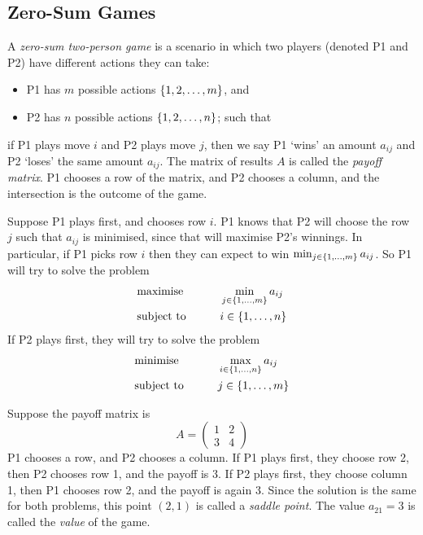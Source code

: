 \subsection{Zero-Sum Games}
\begin{definition}
	A \textit{zero-sum two-person game} is a scenario in which two players (denoted P1 and P2) have different actions they can take:
	\begin{itemize}
		\item P1 has \( m \) possible actions \( \qty{1, 2, \dots, m } \), and
		\item P2 has \( n \) possible actions \( \qty{1, 2, \dots, n } \); such that
	\end{itemize}
	if P1 plays move \( i \) and P2 plays move \( j \), then we say P1 `wins' an amount \( a_{ij} \) and P2 `loses' the same amount \( a_{ij} \).
	The matrix of results \( A \) is called the \textit{payoff matrix}.
	P1 chooses a row of the matrix, and P2 chooses a column, and the intersection is the outcome of the game.
\end{definition}
Suppose P1 plays first, and chooses row \( i \).
P1 knows that P2 will choose the row \( j \) such that \( a_{ij} \) is minimised, since that will maximise P2's winnings.
In particular, if P1 picks row \( i \) then they can expect to win \( \min_{j \in \qty{1,\dots,m}} a_{ij} \).
So P1 will try to solve the problem
\begin{alignat*}{2}
	 & \text{maximise}   & \qquad & \min_{j \in \qty{1,\dots,m}} a_{ij} \\
	 & \text{subject to} &        & i \in \qty{1,\dots,n}
\end{alignat*}
If P2 plays first, they will try to solve the problem
\begin{alignat*}{2}
	 & \text{minimise}   & \qquad & \max_{i \in \qty{1,\dots,n}} a_{ij} \\
	 & \text{subject to} &        & j \in \qty{1,\dots,m}
\end{alignat*}
\begin{example}
	Suppose the payoff matrix is
	\[
		A = \begin{pmatrix}
			1 & 2 \\ 3 & 4
		\end{pmatrix}
	\]
	P1 chooses a row, and P2 chooses a column.
	If P1 plays first, they choose row 2, then P2 chooses row 1, and the payoff is 3.
	If P2 plays first, they choose column 1, then P1 chooses row 2, and the payoff is again 3.
	Since the solution is the same for both problems, this point \( (2,1) \) is called a \textit{saddle point}.
	The value \( a_{21} = 3 \) is called the \textit{value} of the game.
\end{example}
